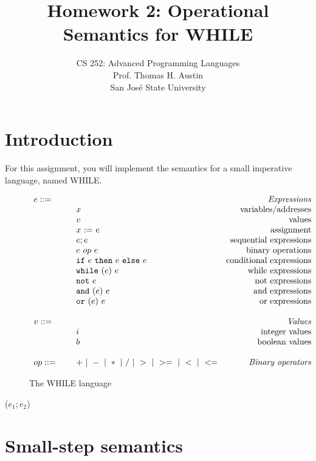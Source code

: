 \documentclass{article}
\title{Homework 2: Operational Semantics for WHILE}
\author{
  CS 252: Advanced Programming Languages \\
  Prof. Thomas H. Austin \\
  San Jos\'{e} State University \\
  }
\date{}
\begin{document}
\maketitle

\section{Introduction}

For this assignment,
you will implement the semantics for a small imperative language, named WHILE.

\newcommand{\mydefhead}[2]{\multicolumn{2}{l}{{#1}}&\mbox{\emph{#2}}\\}
\newcommand{\mydefcase}[2]{\qquad\qquad& #1 &\mbox{#2}\\}

\newcommand{\assign}[2]{#1~{:=}~#2}
\newcommand{\ife}[3]{\mbox{\tt if}~{#1}~\mbox{\tt then}~{#2}~\mbox{\tt else}~{#3}}
\newcommand{\whilee}[2]{\mbox{\tt while}~(#1)~#2}
\newcommand{\note}[1]{\mbox{\tt not}~#1}
\newcommand{\ande}[2]{\mbox{\tt and}~(#1)~#2}
\newcommand{\ore}[2]{\mbox{\tt or}~(#1)~#2}
\newcommand{\true}{\mbox{\tt true}}
\newcommand{\false}{\mbox{\tt false}}

\begin{figure}\label{fig:lang}
\caption{The WHILE language}
\[
\begin{array}{llr}
  \mydefhead{e ::=\qquad\qquad\qquad\qquad}{Expressions}
  \mydefcase{x}{variables/addresses}
  \mydefcase{v}{values}
  \mydefcase{\assign x e}{assignment}
  \mydefcase{e; e}{sequential expressions}
  \mydefcase{e ~op~ e}{binary operations}
  \mydefcase{\ife e e e}{conditional expressions}
  \mydefcase{\whilee e e}{while expressions}
  \mydefcase{\note e}{not expressions}
  \mydefcase{\ande e e}{and expressions}
  \mydefcase{\ore e e}{or expressions}
  \\
  \mydefhead{v ::=\qquad\qquad\qquad\qquad}{Values}
  \mydefcase{i}{integer values}
  \mydefcase{b}{boolean values}
  \\
  op ::= & + ~|~ - ~|~ * ~|~ / ~|~ > ~|~ >= ~|~ < ~|~ <=  & \mbox{\emph{Binary operators}} \\
\end{array}
\]
\end{figure}
($e_1;e_2$)



\section{Small-step semantics}
\end{document}
